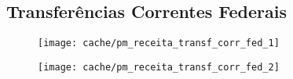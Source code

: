 
\subsection{Transferências Correntes Federais}





\begin{figure}[H]
\center
\texttt{[image: cache/pm\_receita\_transf\_corr\_fed\_1]}
\end{figure}

\begin{figure}[H]
\center
\texttt{[image: cache/pm\_receita\_transf\_corr\_fed\_2]}
\end{figure}

